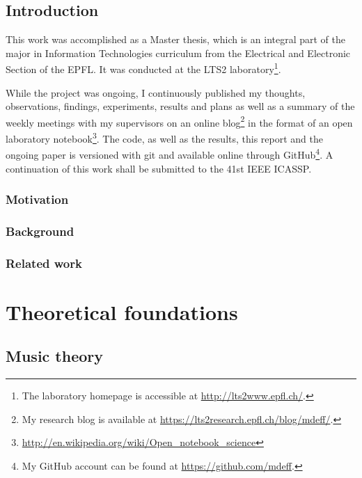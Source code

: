 \documentclass[a4paper,12pt,twoside]{report}
\begin{document}
\chapter*{Introduction}

This work was accomplished as a Master thesis, which is an integral part of the major in Information Technologies curriculum from the Electrical and Electronic Section of the \gls{EPFL}. It was conducted at the LTS2 laboratory\footnote{The laboratory homepage is accessible at \url{http://lts2www.epfl.ch/}.}.

While the project was ongoing, I continuously published my thoughts, observations, findings, experiments, results and plans as well as a summary of the weekly meetings with my supervisors on an online blog\footnote{My research blog is available at \url{https://lts2research.epfl.ch/blog/mdeff/}.} in the format of an open laboratory notebook\footnote{\url{http://en.wikipedia.org/wiki/Open_notebook_science}}. The code, as well as the results, this report and the ongoing paper is versioned with git and available online through GitHub\footnote{My GitHub account can be found at \url{https://github.com/mdeff}.}. A continuation of this work shall be submitted to the 41st IEEE \gls{ICASSP}.

\section*{Motivation}

\section*{Background}
\label{background}

\section*{Related work}

\part{Theoretical foundations}

\chapter{Music theory}
\end{document}
